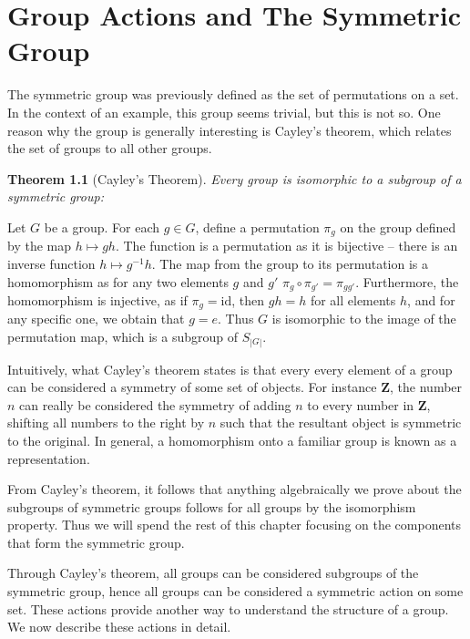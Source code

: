 \documentclass[12pt]{amsbook}
\makeatletter
\theoremstyle{plain}
\newtheorem{theorem}{Theorem}[chapter]
\theoremstyle{definition}
\renewenvironment{proof}[1][\proofname]{\par
  \pushQED{\qed}%
  \normalfont \topsep6\p@\@plus6\p@\relax
  \list{}{\leftmargin=0em
          \rightmargin=\leftmargin
          \settowidth{\itemindent}{\itshape#1}%
          \labelwidth=\itemindent}

  \item[\hskip\labelsep
        \itshape
    #1\@addpunct{.}]\ignorespaces
}{%
  \popQED\endlist\@endpefalse
}
\makeatother
\begin{document}
\chapter{Group Actions and The Symmetric Group}

The symmetric group was previously defined as the set of permutations on a set. In the context of an example, this group seems trivial, but this is not so. One reason why the group is generally interesting is Cayley's theorem, which relates the set of groups to all other groups.

\begin{theorem}[Cayley's Theorem] 
    Every group is isomorphic to a subgroup of a symmetric group:
\end{theorem}
\begin{proof}
    Let $G$ be a group. For each $g \in G$, define a permutation $\pi_g$ on the group defined by the map $h \mapsto gh$. The function is a permutation as it is bijective -- there is an inverse function $h \mapsto g^{-1}h$. The map from the group to its permutation is a homomorphism as for any two elements $g$ and $g'$ $\pi_g \circ \pi_{g'} = \pi_{gg'}$. Furthermore, the homomorphism is injective, as if $\pi_g = \text{id}$, then $gh = h$ for all elements $h$, and for any specific one, we obtain that $g = e$. Thus $G$ is isomorphic to the image of the permutation map, which is a subgroup of $S_{|G|}$.
\end{proof}

Intuitively, what Cayley's theorem states is that every every element of a group can be considered a symmetry of some set of objects. For instance $\mathbf{Z}$, the number $n$ can really be considered the symmetry of adding $n$ to every number in $\mathbf{Z}$, shifting all numbers to the right by $n$ such that the resultant object is symmetric to the original. In general, a homomorphism onto a familiar group is known as a representation.

From Cayley's theorem, it follows that anything algebraically we prove about the subgroups of symmetric groups follows for all groups by the isomorphism property. Thus we will spend the rest of this chapter focusing on the components that form the symmetric group.

Through Cayley's theorem, all groups can be considered subgroups of the symmetric group, hence all groups can be considered a symmetric action on some set. These actions provide another way to understand the structure of a group. We now describe these actions in detail.
\end{document}
